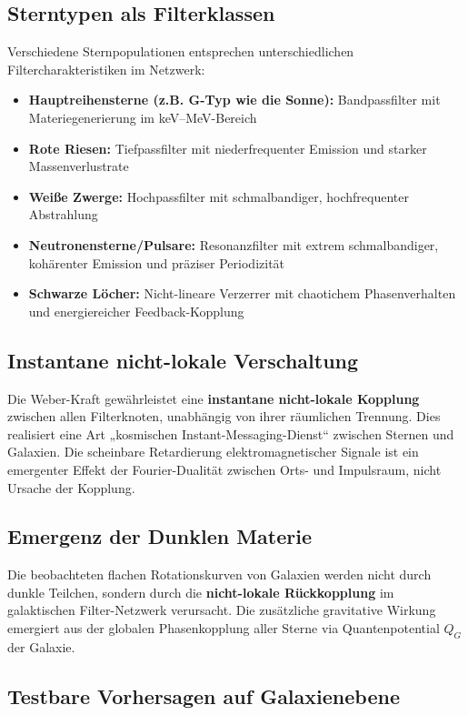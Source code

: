 \subsection{Sterntypen als Filterklassen}

Verschiedene Sternpopulationen entsprechen unterschiedlichen Filtercharakteristiken im Netzwerk:

\begin{itemize}
\item \textbf{Hauptreihensterne (z.B. G-Typ wie die Sonne):} Bandpassfilter mit Materiegenerierung im keV–MeV-Bereich
\item \textbf{Rote Riesen:} Tiefpassfilter mit niederfrequenter Emission und starker Massenverlustrate
\item \textbf{Weiße Zwerge:} Hochpassfilter mit schmalbandiger, hochfrequenter Abstrahlung
\item \textbf{Neutronensterne/Pulsare:} Resonanzfilter mit extrem schmalbandiger, kohärenter Emission und präziser Periodizität
\item \textbf{Schwarze Löcher:} Nicht-lineare Verzerrer mit chaotichem Phasenverhalten und energiereicher Feedback-Kopplung
\end{itemize}

\subsection{Instantane nicht-lokale Verschaltung}

Die Weber-Kraft gewährleistet eine \textbf{instantane nicht-lokale Kopplung} zwischen allen Filterknoten, unabhängig von ihrer räumlichen Trennung. Dies realisiert eine Art „kosmischen Instant-Messaging-Dienst“ zwischen Sternen und Galaxien. Die scheinbare Retardierung elektromagnetischer Signale ist ein emergenter Effekt der Fourier-Dualität zwischen Orts- und Impulsraum, nicht Ursache der Kopplung.

\subsection{Emergenz der Dunklen Materie}

Die beobachteten flachen Rotationskurven von Galaxien werden nicht durch dunkle Teilchen, sondern durch die \textbf{nicht-lokale Rückkopplung} im galaktischen Filter-Netzwerk verursacht. Die zusätzliche gravitative Wirkung emergiert aus der globalen Phasenkopplung aller Sterne via Quantenpotential \(Q_G\) der Galaxie.

\subsection{Testbare Vorhersagen auf Galaxienebene}


